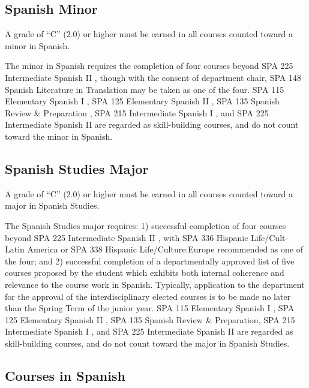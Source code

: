 \documentclass[
  letterpaper,
]{scrbook}
\begin{document}
\hypertarget{spanish-minor}{%
\subsection{Spanish Minor}\label{spanish-minor}}

A grade of ``C'' (2.0) or higher must be earned in all courses counted
toward a minor in Spanish.

The minor in Spanish requires the completion of four courses beyond SPA
225 Intermediate Spanish II , though with the consent of department
chair, SPA 148 Spanish Literature in Translation may be taken as one of
the four. SPA 115 Elementary Spanish I , SPA 125 Elementary Spanish II ,
SPA 135 Spanish Review \& Preparation , SPA 215 Intermediate Spanish I ,
and SPA 225 Intermediate Spanish II are regarded as skill-building
courses, and do not count toward the minor in Spanish.

\hypertarget{spanish-studies-major}{%
\subsection{Spanish Studies Major}\label{spanish-studies-major}}

A grade of ``C'' (2.0) or higher must be earned in all courses counted
toward a major in Spanish Studies.

The Spanish Studies major requires: 1) successful completion of four
courses beyond SPA 225 Intermediate Spanish II , with SPA 336 Hispanic
Life/Cult-Latin America or SPA 338 Hispanic Life/Culture:Europe
recommended as one of the four; and 2) successful completion of a
departmentally approved list of five courses proposed by the student
which exhibits both internal coherence and relevance to the course work
in Spanish. Typically, application to the department for the approval of
the interdisciplinary elected courses is to be made no later than the
Spring Term of the junior year. SPA 115 Elementary Spanish I , SPA 125
Elementary Spanish II , SPA 135 Spanish Review \& Preparation, SPA 215
Intermediate Spanish I , and SPA 225 Intermediate Spanish II are
regarded as skill-building courses, and do not count toward the major in
Spanish Studies.

\hypertarget{courses-in-spanish}{%
\subsection{Courses in Spanish}\label{courses-in-spanish}}
\end{document}
